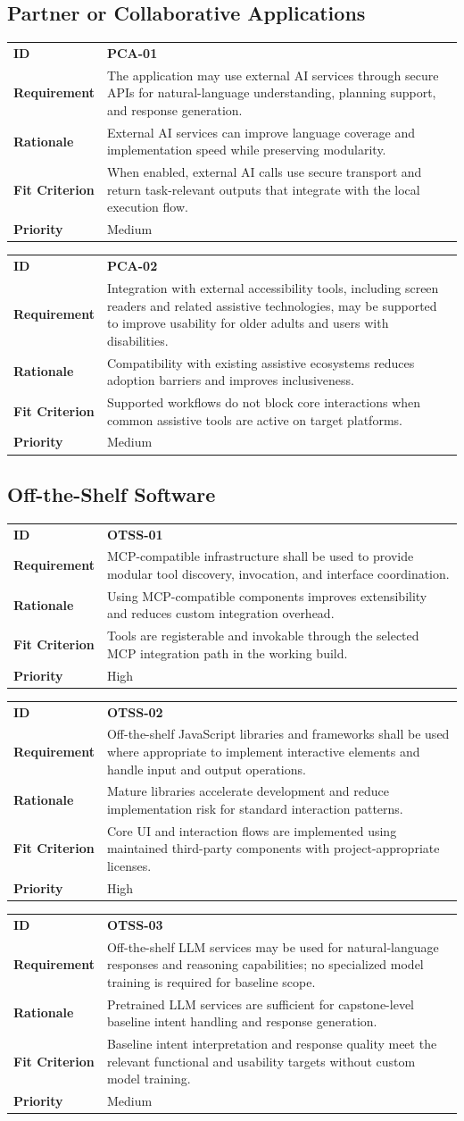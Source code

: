 \documentclass[12pt]{article}
\makeatletter
\newcommand{\reqcard}[5]{%
\noindent\begin{tabularx}{\textwidth}{@{}p{2.35cm}X@{}}
\textbf{ID} & \textbf{#1} \\
\textbf{Requirement} & #2 \\
\textbf{Rationale} & #3 \\
\textbf{Fit Criterion} & #4 \\
\textbf{Priority} & #5 \\
\end{tabularx}\par\medskip
}
\makeatother
\begin{document}
\subsection{Partner or Collaborative Applications}
\reqcard{PCA-01}{The application may use external AI services through
secure APIs for natural-language understanding, planning support, and
response generation.}{External AI services can improve language
coverage and implementation speed while preserving modularity.}{When
enabled, external AI calls use secure transport and return
task-relevant outputs that integrate with the local execution
flow.}{Medium}

\reqcard{PCA-02}{Integration with external accessibility tools,
including screen readers and related assistive technologies, may be
supported to improve usability for older adults and users with
disabilities.}{Compatibility with existing assistive ecosystems reduces
adoption barriers and improves inclusiveness.}{Supported workflows do
not block core interactions when common assistive tools are active on
target platforms.}{Medium}

\subsection{Off-the-Shelf Software}
\reqcard{OTSS-01}{MCP-compatible infrastructure shall be used to
provide modular tool discovery, invocation, and interface
coordination.}{Using MCP-compatible components improves extensibility
and reduces custom integration overhead.}{Tools are registerable and
invokable through the selected MCP integration path in the working
build.}{High}

\reqcard{OTSS-02}{Off-the-shelf JavaScript libraries and frameworks
shall be used where appropriate to implement interactive elements and
handle input and output operations.}{Mature libraries accelerate
development and reduce implementation risk for standard interaction
patterns.}{Core UI and interaction flows are implemented using
maintained third-party components with project-appropriate
licenses.}{High}

\reqcard{OTSS-03}{Off-the-shelf LLM services may be used for
natural-language responses and reasoning capabilities; no specialized
model training is required for baseline scope.}{Pretrained LLM
services are sufficient for capstone-level baseline intent handling and
response generation.}{Baseline intent interpretation and response
quality meet the relevant functional and usability targets without
custom model training.}{Medium}
\end{document}
